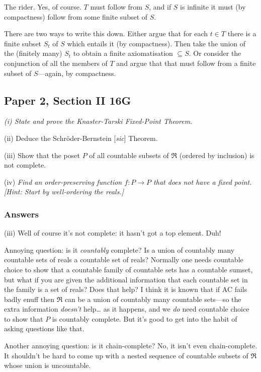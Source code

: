 \documentclass{book}
\begin{document}
The rider.  Yes, of course.  $T$ must follow from $S$, and if $S$ is
infinite it must (by compactness) follow from some finite subset of
$S$.

There are two ways to write this down.  Either argue that for each
$t \in T$ there is a finite subset $S_t$ of $S$ which entails it (by
compactness).  Then take the union of the (finitely many) $S_t$ to
obtain a finite axiomatisation $\subseteq S$.  Or consider the
conjunction of all the members of $T$ and argue that that must follow
from a finite subset of $S$---again, by compactness.
 
\subsection*{Paper 2, Section  II 16G}

{\sl (i) State and prove the Knaster-Tarski Fixed-Point Theorem.

  (ii) Deduce the
  Schr\"oder-Bernstein [{\sl sic}] Theorem.

  (iii) Show that the poset $P$ of
all countable subsets of $\Re$ (ordered by inclusion) is not complete.}

(iv) {\sl Find an order-preserving function $f : P \to P$ that does not
  have a fixed point.  [Hint: Start by well-ordering the reals.]}

\subsubsection*{Answers}

(iii) Well of course it's not complete: it hasn't got a top element.  Duh!

  Annoying question: is it {\sl countably} complete?  Is a union of
  countably many countable sets of reals a countable set of reals?
  Normally one needs countable choice to show that a countable family
  of countable sets has a countable sumset, but what if you are given
  the additional information that each countable set in the family is
  a set of reals?  Does that help?  I think it is known that if AC
  fails badly enuff then $\Re$ can be a union of countably many
  countable sets---so the extra information {\sl doesn't} help\ldots
  as it happens, and we {\sl do} need countable choice to show that
  $P$ is countably complete.  But it's good to get into the habit of
  asking questions like that.

Another annoying question: is it chain-complete?  No, it isn't even
chain-complete.  It shouldn't be hard to come up with a nested
sequence of countable subsets of $\Re$ whose union is uncountable.
\end{document}

